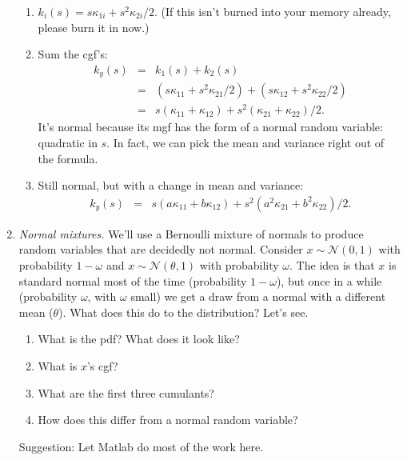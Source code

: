\begin{enumerate}
\begin{enumerate}
\item $  k_i(s) = s \kappa_{1i} + s^2 \kappa_{2i}/2 $.
(If this isn't burned into your memory already, please burn it in now.)
\item Sum the cgf's:
\begin{eqnarray*}
    k_y(s) &=& k_1(s) + k_2(s) \\
            &=& (s \kappa_{11} + s^2 \kappa_{21}/2) + (s\kappa_{12} + s^2 \kappa_{22}/2) \\
            &=& s (\kappa_{11} + \kappa_{12} )
                + s^2 (\kappa_{21} + \kappa_{22})/2 .
\end{eqnarray*}
It's normal because its mgf has the form of a normal random variable:
quadratic in $s$.
In fact, we can pick the mean and variance right out of the formula.
\item Still normal, but with a change in mean and variance:
\begin{eqnarray*}
    k_y(s) &=& s (a \kappa_{11} + b \kappa_{12} )
                + s^2 (a^2 \kappa_{21} + b^2 \kappa_{22})/2  .
\end{eqnarray*}
\end{enumerate}


\item {\it Normal mixtures.\/}
We'll use a Bernoulli mixture of normals to produce
random variables that are decidedly not normal.
Consider $x \sim \mathcal{N}(0,1)$
with probability $1-\omega$
and $x \sim \mathcal{N}(\theta,1)$ with probability $\omega$.
The idea is that $x$ is standard normal most of the time (probability $1-\omega$),
but once in a while (probability $\omega$, with $\omega$ small)
we get a draw from a normal with a different mean ($\theta$).
What does this do to the distribution?
Let's see.
%
\begin{enumerate}
\item What is the pdf?  What does it look like?
\item What is $x$'s cgf?
\item What are the first three cumulants?
\item How does this differ from a normal random variable?
\end{enumerate}
Suggestion:  Let Matlab do most of the work here.


\end{enumerate}
